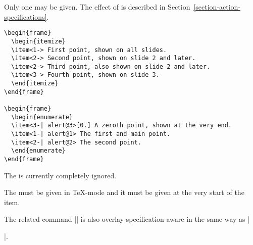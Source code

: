 \begin{command}{\item{}}
  \beamernote
  Only one  may be given. The effect of
   is described in
  Section~\ref{section-action-specifications}.

  \example
\begin{verbatim}
\begin{frame}
  \begin{itemize}
  \item<1-> First point, shown on all slides.
  \item<2-> Second point, shown on slide 2 and later.
  \item<2-> Third point, also shown on slide 2 and later.
  \item<3-> Fourth point, shown on slide 3.
  \end{itemize}
\end{frame}

\begin{frame}
  \begin{enumerate}
  \item<3-| alert@3>[0.] A zeroth point, shown at the very end.
  \item<1-| alert@1> The first and main point.
  \item<2-| alert@2> The second point.
  \end{enumerate}
\end{frame}
\end{verbatim}

  \articlenote
  The  is currently completely ignored.

  \lyxnote
  The  must be given in \TeX-mode and it
  must be given at the very start of the item.
\end{command}

The related command |\bibitem| is also overlay-specification-aware
in the same way as |\item|.

